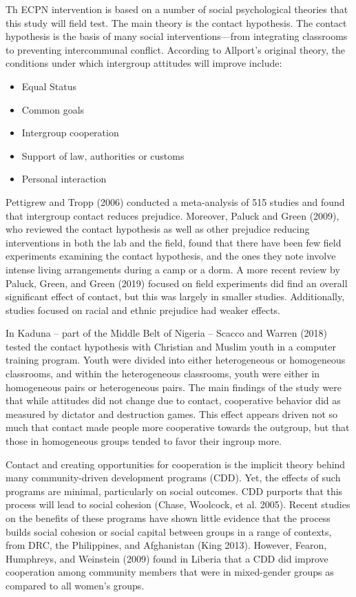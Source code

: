 \documentclass[
]{article}
\providecommand{\tightlist}{%
  \setlength{\itemsep}{0pt}\setlength{\parskip}{0pt}}
\begin{document}
Th ECPN intervention is based on a number of social psychological
theories that this study will field test. The main theory is the contact
hypothesis. The contact hypothesis is the basis of many social
interventions---from integrating classrooms to preventing intercommunal
conflict. According to Allport's original theory, the conditions under
which intergroup attitudes will improve include:

\begin{itemize}
\tightlist
\item
  Equal Status
\item
  Common goals
\item
  Intergroup cooperation
\item
  Support of law, authorities or customs
\item
  Personal interaction
\end{itemize}

Pettigrew and Tropp (2006) conducted a meta-analysis of 515 studies and
found that intergroup contact reduces prejudice. Moreover, Paluck and
Green (2009), who reviewed the contact hypothesis as well as other
prejudice reducing interventions in both the lab and the field, found
that there have been few field experiments examining the contact
hypothesis, and the ones they note involve intense living arrangements
during a camp or a dorm. A more recent review by Paluck, Green, and
Green (2019) focused on field experiments did find an overall
significant effect of contact, but this was largely in smaller studies.
Additionally, studies focused on racial and ethnic prejudice had weaker
effects.

In Kaduna -- part of the Middle Belt of Nigeria -- Scacco and Warren
(2018) tested the contact hypothesis with Christian and Muslim youth in
a computer training program. Youth were divided into either
heterogeneous or homogeneous classrooms, and within the heterogeneous
classrooms, youth were either in homogeneous pairs or heterogeneous
pairs. The main findings of the study were that while attitudes did not
change due to contact, cooperative behavior did as measured by dictator
and destruction games. This effect appears driven not so much that
contact made people more cooperative towards the outgroup, but that
those in homogeneous groups tended to favor their ingroup more.

Contact and creating opportunities for cooperation is the implicit
theory behind many community-driven development programs (CDD). Yet, the
effects of such programs are minimal, particularly on social outcomes.
CDD purports that this process will lead to social cohesion (Chase,
Woolcock, et al. 2005). Recent studies on the benefits of these programs
have shown little evidence that the process builds social cohesion or
social capital between groups in a range of contexts, from DRC, the
Philippines, and Afghanistan (King 2013). However, Fearon, Humphreys,
and Weinstein (2009) found in Liberia that a CDD did improve cooperation
among community members that were in mixed-gender groups as compared to
all women's groups.
\end{document}
